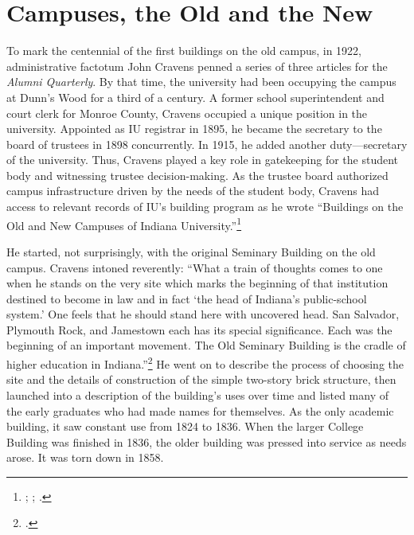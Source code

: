 \documentclass[
  american,
  letterpaper,
]{scrreprt}
\begin{document}
\section{Campuses, the Old and the
New}\label{campuses-the-old-and-the-new}

To mark the centennial of the first buildings on the old campus, in
1922, administrative factotum John Cravens penned a series of three
articles for the \emph{Alumni Quarterly}. By that time, the university
had been occupying the campus at Dunn's Wood for a third of a century. A
former school superintendent and court clerk for Monroe County, Cravens
occupied a unique position in the university. Appointed as IU registrar
in 1895, he became the secretary to the board of trustees in 1898
concurrently. In 1915, he added another duty---secretary of the
university. Thus, Cravens played a key role in gatekeeping for the
student body and witnessing trustee decision-making. As the trustee
board authorized campus infrastructure driven by the needs of the
student body, Cravens had access to relevant records of IU's building
program as he wrote ``Buildings on the Old and New Campuses of Indiana
University.''\footnote{; ; .}

He started, not surprisingly, with the original Seminary Building on the
old campus. Cravens intoned reverently: ``What a train of thoughts comes
to one when he stands on the very site which marks the beginning of that
institution destined to become in law and in fact `the head of Indiana's
public-school system.' One feels that he should stand here with
uncovered head. San Salvador, Plymouth Rock, and Jamestown each has its
special significance. Each was the beginning of an important movement.
The Old Seminary Building is the cradle of higher education in
Indiana.''\footnote{.} He went
on to describe the process of choosing the site and the details of
construction of the simple two-story brick structure, then launched into
a description of the building's uses over time and listed many of the
early graduates who had made names for themselves. As the only academic
building, it saw constant use from 1824 to 1836. When the larger College
Building was finished in 1836, the older building was pressed into
service as needs arose. It was torn down in 1858.
\end{document}
